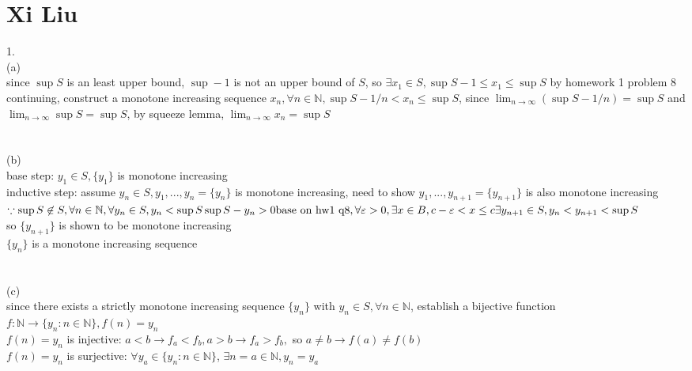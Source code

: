 \documentclass[12pt, border = 4pt, multi]{article} %
\begin{document}
\section*{Xi Liu}
1.\\
(a)\\
since $\sup S$ is an least upper bound, $\sup - 1$ is not an upper bound of $S$, so $\exists x_1 \in S, \sup S - 1 \leq x_1 \leq \sup S$ by homework 1 problem 8\\
continuing, construct a monotone increasing sequence $x_n, \forall n \in \mathbb{N}, \sup S - 1 / n < x_n \leq \sup S$, since $\lim_{n \rightarrow \infty} (\sup S - 1 / n) = \sup S$ and $\lim_{n \rightarrow \infty} \sup S = \sup S$, by squeeze lemma, $\lim_{n \rightarrow \infty} x_n = \sup S$\\
\\
\\
(b)\\
base step: $y_1 \in S, \{y_1\}$ is monotone increasing\\
inductive step: assume $y_n \in S, y_1, ..., y_n = \{y_n\}$ is monotone increasing, need to show $y_1, ..., y_{n + 1} = \{y_{n + 1}\}$ is also monotone increasing\\
$\because \sup S \not\in S, \forall n \in \mathbb{N}, \forall y_n \in S, y_n < \sup S \\
\sup S - y_n > 0\\
\text{base on hw1 q8}, \forall \varepsilon > 0, \exists x \in B, c - \varepsilon < x \leq c\\
\exists y_{n + 1} \in S, y_n < y_{n + 1} < \sup S$\\
so $\{y_{n + 1}\}$ is shown to be monotone increasing\\
$\{y_n\}$ is a monotone increasing sequence\\
\\
\\
(c)\\
since there exists a strictly monotone increasing sequence $\{y_n\}$ with $y_n \in S, \forall n \in \mathbb{N}$, establish a bijective function $f: \mathbb{N} \rightarrow \{y_n : n \in \mathbb{N}\}, f(n) = y_n$\\
$f(n) = y_n$ is injective: $a < b \rightarrow f_a < f_b, a > b \rightarrow f_a > f_b,$ so $a \not= b \rightarrow f(a) \not= f(b)$\\
$f(n) = y_n$ is surjective: $\forall y_a \in \{y_n: n \in \mathbb{N}\}$, $\exists n = a \in \mathbb{N}, y_n = y_a$\\
\\
\\
\end{document}
